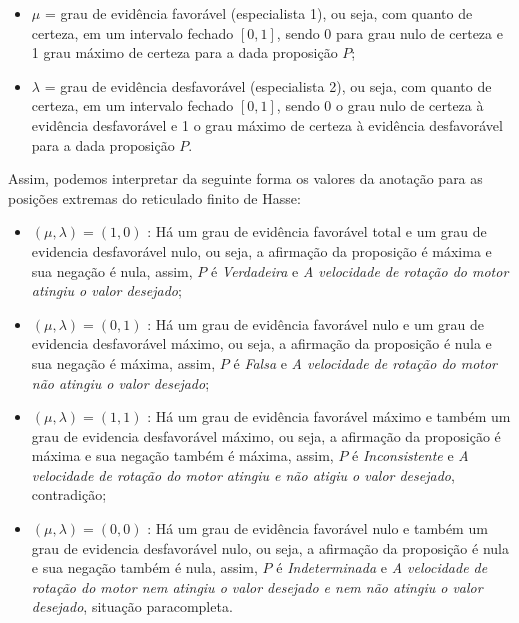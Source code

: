 \begin{itemize}
\item 
$\mu$ = grau de evidência favorável (especialista 1), ou seja, com quanto de certeza, em um intervalo fechado $[0,1]$, sendo 0 para grau nulo de certeza e 1 grau máximo de certeza para a dada proposição $P$;

\item
$\lambda$ = grau de evidência desfavorável (especialista 2), ou seja, com quanto de certeza, em um intervalo fechado $[0,1]$, sendo 0 o grau nulo de certeza à evidência desfavorável e 1 o grau máximo de certeza à evidência desfavorável para a dada proposição $P$.

\end{itemize}


Assim, podemos interpretar da seguinte forma os valores da anotação para as posições extremas do reticulado finito de Hasse:

\begin{itemize}
\item 
$(\mu, \lambda ) = (1,0)$ : Há um grau de evidência favorável total e um grau de evidencia desfavorável nulo, ou seja, a afirmação da proposição é máxima e sua negação é nula, assim,  $P$ é \emph{Verdadeira} e \emph{A velocidade de rotação do motor atingiu o valor desejado};

\item 
$(\mu, \lambda ) = (0,1)$ : Há um grau de evidência favorável nulo e um grau de evidencia desfavorável máximo, ou seja, a afirmação da proposição é nula e sua negação é máxima, assim,  $P$ é \emph{Falsa} e \emph{A velocidade de rotação do motor não atingiu o valor desejado};

\item 
$(\mu, \lambda ) = (1,1)$ : Há um grau de evidência favorável máximo e também um grau de evidencia desfavorável máximo, ou seja, a afirmação da proposição é máxima e sua negação também é máxima, assim,  $P$ é \emph{Inconsistente} e \emph{A velocidade de rotação do motor atingiu e não atigiu o valor desejado}, contradição;

\item 
$(\mu, \lambda ) = (0,0)$ : Há um grau de evidência favorável nulo e também um grau de evidencia desfavorável nulo, ou seja, a afirmação da proposição é nula e sua negação também é nula, assim,  $P$ é \emph{Indeterminada} e \emph{A velocidade de rotação do motor nem atingiu o valor desejado e nem não atingiu o valor desejado}, situação paracompleta.

\end{itemize}

